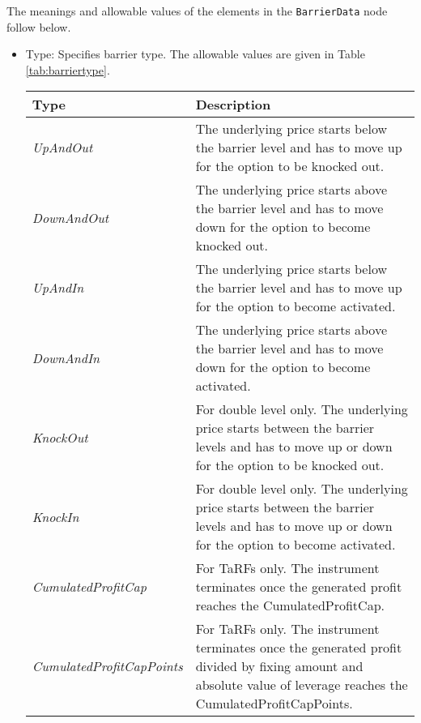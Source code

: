 The meanings and allowable values of the elements in the \lstinline!BarrierData! node follow below.

\begin{itemize}
\item Type: Specifies barrier type.
The allowable values are given in Table \ref{tab:barriertype}. 

\begin{table}[H]
\centering
  \begin{tabular} {|l|p{12cm}|}
    \hline
 \bfseries{Type} & \bfseries{Description} \\
    \hline
 \emph{UpAndOut} & The underlying price starts below the barrier level and has to move up for the option to be knocked out.\\ \hline
 \emph{DownAndOut} & The underlying price starts above the barrier level and has to move down for the option to become knocked out. \\ \hline
 \emph{UpAndIn} & The underlying price starts below the barrier level and has to move up for the option to become activated. \\ \hline
 \emph{DownAndIn} & The underlying price starts above the barrier level and has to move down for the option to become activated.\\ \hline
 \emph{KnockOut} & For double level only. The underlying price starts between the barrier levels and has to move up
 or down for the option to be knocked out. \\ \hline
 \emph{KnockIn} & For double level only. The underlying price starts between the barrier levels and has to move up
 or down for the option to become activated. \\ \hline
 \emph{CumulatedProfitCap} & For TaRFs only. The instrument terminates once the generated profit reaches the CumulatedProfitCap. \\ \hline
 \emph{CumulatedProfitCapPoints} & For TaRFs only. The instrument terminates once the generated profit divided by fixing amount and absolute value of leverage reaches the CumulatedProfitCapPoints. \\ \hline

\end{tabular}
\end{table}
\end{itemize}
